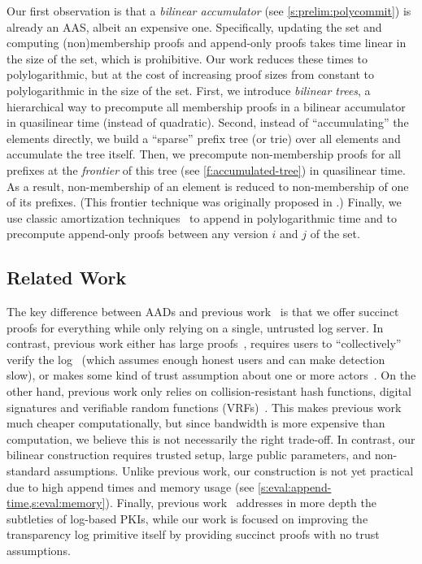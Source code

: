 Our first observation is that a \textit{bilinear accumulator} (see \cref{s:prelim:polycommit}) is already an AAS, albeit an expensive one.
Specifically, updating the set and computing (non)membership proofs and append-only proofs takes time linear in the size of the set, which is prohibitive.
Our work reduces these times to polylogarithmic, but at the cost of increasing proof sizes from constant to polylogarithmic in the size of the set.
First, we introduce \textit{bilinear trees}, a hierarchical way to precompute all membership proofs in a bilinear accumulator in quasilinear time (instead of quadratic).
Second, instead of ``accumulating'' the elements directly, we build a ``sparse'' prefix tree (or trie) over all elements and accumulate the tree itself.
Then, we precompute non-membership proofs for all prefixes at the \textit{frontier} of this tree (see \cref{f:accumulated-tree}) in quasilinear time.
As a result, non-membership of an element is reduced to non-membership of one of its prefixes.
(This frontier technique was originally proposed in \cite{zks}.)
Finally, we use classic amortization techniques~\cite{overmars,overmars-van-leeuwen} to append in polylogarithmic time and to precompute append-only proofs between any version $i$ and $j$ of the set.


\subsection{Related Work}
\label{s:related-work}
The key difference between AADs and previous work~\cite{BuldasLaudLipmaa2000,ct,ect,aki,arpki,policert,coniks,dtki} is that we offer succinct proofs for everything while only relying on a single, untrusted log server.
In contrast, previous work either has large proofs~\cite{ct,coniks}, requires users to ``collectively'' verify the log~\cite{ect,dtki} (which assumes enough honest users and can make detection slow), or makes some kind of trust assumption about one or more actors~\cite{ct,aki,arpki,policert}.
On the other hand, previous work only relies on collision-resistant hash functions, digital signatures and verifiable random functions (VRFs)~\cite{vrf}.
This makes previous work much cheaper computationally, but since bandwidth is more expensive than computation, we believe this is not necessarily the right trade-off.
In contrast, our bilinear construction requires trusted setup, large public parameters, and non-standard assumptions.
Unlike previous work, our construction is not yet practical due to high append times and memory usage (see \cref{s:eval:append-time,s:eval:memory}).
Finally, previous work~\cite{aki,arpki,dtki,policert} addresses in more depth the subtleties of log-based PKIs, while our work is focused on improving the transparency log primitive itself by providing succinct proofs with no trust assumptions.

